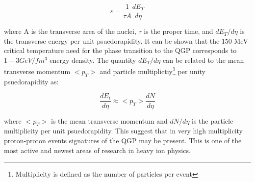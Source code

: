 \begin{equation}
\varepsilon = \frac{1}{\tau A} \frac{dE_{T}}{d \eta}
\label{eq:bjorkenEt}
\end{equation}

\noindent
where A is the transverse area of the nuclei, $\tau$ is the proper time, and $dE_{T}/d \eta$ is the transverse energy per unit psuedorapidity.  It can be shown that  the 150 MeV critical temperature need for the phase transition to the QGP corresponds to ~ $1 - 3 GeV/fm^{3}$ energy density.  The quantity $dE_{T}/d \eta$ can be related to the mean transverse momentum $<p_{T}>$ and particle multiplictiy\footnote{Multiplicity is defined as the number of particles per event} per unity psuedorapidity as:

\begin{equation}
\frac{dE_{t}}{d \eta}  \approx  <p_{T}> \frac{dN}{d\eta}
\label{eq:Et}
\end{equation}

where $ <p_{T} >$ is the mean transverse momentum and $dN/d\eta$ is the particle multiplicity per unit psuedorapidity.
This suggest that in very high multiplicity proton-proton events signatures of the QGP may be present.  This is one of the most active and newest areas of research in heavy ion physics.  